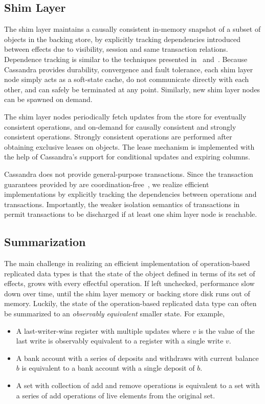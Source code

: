 \subsection{Shim Layer}

The shim layer maintains a causally consistent in-memory snapshot of a subset
of objects in the backing store, by explicitly tracking dependencies introduced
between effects due to visibility, session and same transaction relations.
Dependence tracking is similar to the techniques presented in~\cite{BoltOn}
and~\cite{Eiger}. Because Cassandra provides durability, convergence and fault
tolerance, each shim layer node simply acts as a soft-state cache, do not
communicate directly with each other, and can safely be terminated at any point.
Similarly, new shim layer nodes can be spawned on demand.

The shim layer nodes periodically fetch updates from the store for eventually
consistent operations, and on-demand for causally consistent and strongly
consistent operations. Strongly consistent operations are performed after
obtaining exclusive leases on objects. The lease mechanism is implemented with
the help of Cassandra's support for conditional updates and expiring columns.

Cassandra does not provide general-purpose transactions. Since the transaction
guarantees provided by \name are coordination-free~\cite{BailisHAT}, we realize
efficient implementations by explicitly tracking the dependencies between
operations and transactions. Importantly, the weaker isolation semantics of
transactions in \name permit transactions to be discharged if at least one shim
layer node is reachable.

\subsection{Summarization}

The main challenge in realizing an efficient implementation of
operation-based replicated data types is that the state of the object
defined in terms of its set of effects, grows with every effectful
operation. If left unchecked, performance slow down over time, until the
shim layer memory or backing store disk runs out of memory. Luckily, the
state of the operation-based replicated data type can often be summarized to
an \emph{observably equivalent} smaller state. For example,

\begin{itemize}
\setlength{\itemsep}{2pt}
\item A last-writer-wins register with multiple updates where $v$ is the value
of the last write is observably equivalent to a register with a single write
$v$.

\item A bank account with a series of deposits and withdraws with current
balance $b$ is equivalent to a bank account with a single deposit of $b$.

\item A set with collection of add and remove operations is equivalent to a set
with a series of add operations of live elements from the original set.
\end{itemize}

